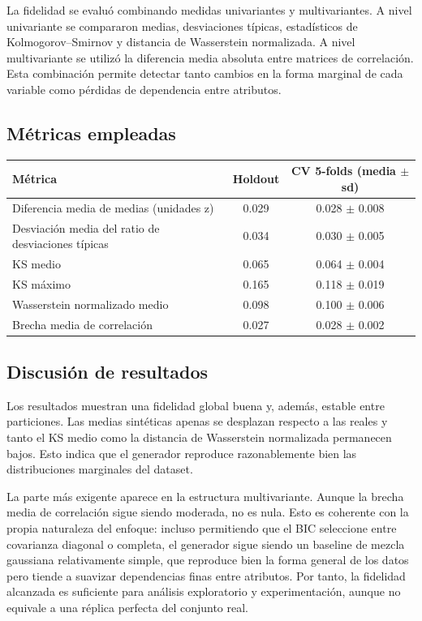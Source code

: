 \documentclass[11pt,a4paper]{article}
\begin{document}
La fidelidad se evaluó combinando medidas univariantes y multivariantes. A nivel univariante se compararon medias, desviaciones típicas, estadísticos de Kolmogorov--Smirnov y distancia de Wasserstein normalizada. A nivel multivariante se utilizó la diferencia media absoluta entre matrices de correlación. Esta combinación permite detectar tanto cambios en la forma marginal de cada variable como pérdidas de dependencia entre atributos.

\subsection*{Métricas empleadas}
\begin{table}[H]
\centering
\small
\renewcommand{\arraystretch}{1.2}
\begin{tabular}{p{7.4cm}cc}
\toprule
\textbf{Métrica} & \textbf{Holdout} & \textbf{CV 5-folds (media $\pm$ sd)} \\
\midrule
Diferencia media de medias (unidades z) & 0.029 & 0.028 $\pm$ 0.008 \\
Desviación media del ratio de desviaciones típicas & 0.034 & 0.030 $\pm$ 0.005 \\
KS medio & 0.065 & 0.064 $\pm$ 0.004 \\
KS máximo & 0.165 & 0.118 $\pm$ 0.019 \\
Wasserstein normalizado medio & 0.098 & 0.100 $\pm$ 0.006 \\
Brecha media de correlación & 0.027 & 0.028 $\pm$ 0.002 \\
\bottomrule
\end{tabular}
\end{table}

\subsection*{Discusión de resultados}
Los resultados muestran una fidelidad global buena y, además, estable entre particiones. Las medias sintéticas apenas se desplazan respecto a las reales y tanto el KS medio como la distancia de Wasserstein normalizada permanecen bajos. Esto indica que el generador reproduce razonablemente bien las distribuciones marginales del dataset.

La parte más exigente aparece en la estructura multivariante. Aunque la brecha media de correlación sigue siendo moderada, no es nula. Esto es coherente con la propia naturaleza del enfoque: incluso permitiendo que el BIC seleccione entre covarianza diagonal o completa, el generador sigue siendo un baseline de mezcla gaussiana relativamente simple, que reproduce bien la forma general de los datos pero tiende a suavizar dependencias finas entre atributos. Por tanto, la fidelidad alcanzada es suficiente para análisis exploratorio y experimentación, aunque no equivale a una réplica perfecta del conjunto real.
\end{document}
